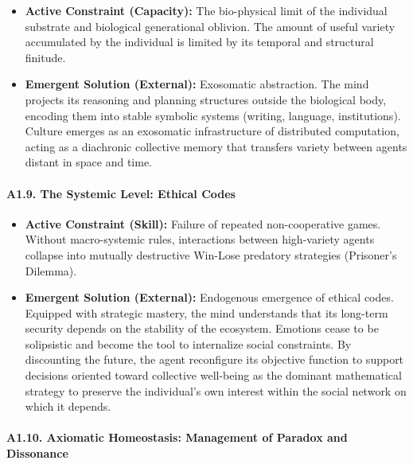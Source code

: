 \documentclass[11pt,a4paper,oneside]{article} %
\providecommand{\tightlist}{%
  \setlength{\itemsep}{0pt}\setlength{\parskip}{0pt}}
\begin{document}
\begin{itemize}
\tightlist
\item
  \textbf{Active Constraint (Capacity):} The bio-physical limit of the
  individual substrate and biological generational oblivion. The amount
  of useful variety accumulated by the individual is limited by its
  temporal and structural finitude.
\item
  \textbf{Emergent Solution (External):} Exosomatic abstraction. The
  mind projects its reasoning and planning structures outside the
  biological body, encoding them into stable symbolic systems (writing,
  language, institutions). Culture emerges as an exosomatic
  infrastructure of distributed computation, acting as a diachronic
  collective memory that transfers variety between agents distant in
  space and time.
\end{itemize}

\hypertarget{a1.9.-the-systemic-level-ethical-codes}{%
\paragraph{A1.9. The Systemic Level: Ethical
Codes}\label{a1.9.-the-systemic-level-ethical-codes}}

\begin{itemize}
\tightlist
\item
  \textbf{Active Constraint (Skill):} Failure of repeated
  non-cooperative games. Without macro-systemic rules, interactions
  between high-variety agents collapse into mutually destructive
  Win-Lose predatory strategies (Prisoner's Dilemma).
\item
  \textbf{Emergent Solution (External):} Endogenous emergence of ethical
  codes. Equipped with strategic mastery, the mind understands that its
  long-term security depends on the stability of the ecosystem. Emotions
  cease to be solipsistic and become the tool to internalize social
  constraints. By discounting the future, the agent reconfigure its
  objective function to support decisions oriented toward collective
  well-being as the dominant mathematical strategy to preserve the
  individual's own interest within the social network on which it
  depends.
\end{itemize}

\hypertarget{a1.10.-axiomatic-homeostasis-management-of-paradox-and-dissonance}{%
\paragraph{A1.10. Axiomatic Homeostasis: Management of Paradox and
Dissonance}\label{a1.10.-axiomatic-homeostasis-management-of-paradox-and-dissonance}}
\end{document}
